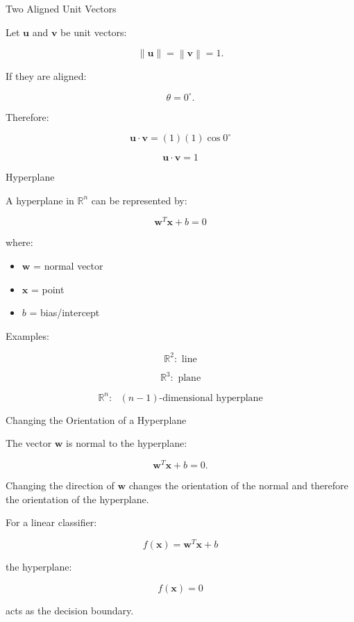 \documentclass[aspectratio=169,11pt]{beamer}
\newcommand{\R}{\mathbb{R}}
\newcommand{\norm}[1]{\left\lVert #1\right\rVert}
\begin{document}
\begin{frame}{Two Aligned Unit Vectors}

Let $\mathbf u$ and $\mathbf v$ be unit vectors:

\[
\norm{\mathbf u}
=
\norm{\mathbf v}
=
1.
\]

If they are aligned:

\[
\theta=0^\circ.
\]

Therefore:

\[
\mathbf u\cdot\mathbf v
=
(1)(1)\cos0^\circ
\]

\[
\boxed{
\mathbf u\cdot\mathbf v=1
}
\]

\end{frame}


\begin{frame}{Hyperplane}

A hyperplane in $\R^n$ can be represented by:

\[
\boxed{
\mathbf w^T\mathbf x+b=0
}
\]

where:

\begin{itemize}
    \item $\mathbf w$ = normal vector
    \item $\mathbf x$ = point
    \item $b$ = bias/intercept
\end{itemize}

Examples:

\[
\R^2:\text{ line}
\]

\[
\R^3:\text{ plane}
\]

\[
\R^n:\text{ $(n-1)$-dimensional hyperplane}
\]

\end{frame}

\begin{frame}{Changing the Orientation of a Hyperplane}

The vector $\mathbf w$ is normal to the hyperplane:

\[
\mathbf w^T\mathbf x+b=0.
\]

Changing the direction of $\mathbf w$ changes the orientation of the normal and therefore the orientation of the hyperplane.

For a linear classifier:

\[
\boxed{
f(\mathbf x)=\mathbf w^T\mathbf x+b
}
\]

the hyperplane:

\[
f(\mathbf x)=0
\]

acts as the decision boundary.

\end{frame}
\end{document}
